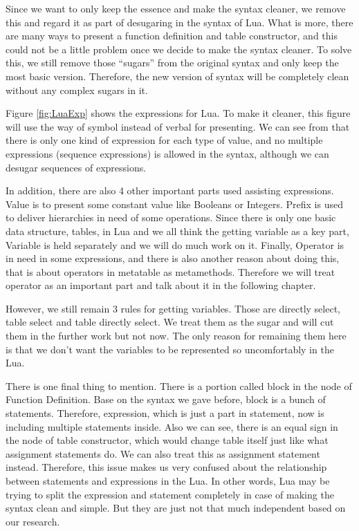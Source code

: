 Since we want to only keep the essence and make the syntax cleaner, we remove this and regard it as part of desugaring in the syntax of Lua. What is more, there are many ways to present a function definition and table constructor, and this could not be a little problem once we decide to make the syntax cleaner. To solve this, we still remove those ``sugars'' from the original syntax and only keep the most basic version. Therefore, the new version of syntax will be completely clean without any complex sugars in it.

Figure \ref{fig:LuaExp} shows the expressions for Lua. To make it cleaner, this figure will use the way of symbol instead of verbal for presenting. We can see from that there is only one kind of expression for each type of value, and no multiple expressions (sequence expressions) is allowed in the syntax, although we can desugar sequences of expressions.

In addition, there are also 4 other important parts used assisting expressions. Value is to present some constant value like Booleans or Integers. Prefix is used to deliver hierarchies in need of some operations. Since there is only one basic data structure, tables, in Lua and we all think the getting variable as a key part, Variable is held separately and we will do much work on it. Finally, Operator is in need in some expressions, and there is also another reason about doing this, that is about operators in metatable as metamethods. Therefore we will treat operator as an important part and talk about it in the following chapter. 

However, we still remain 3 rules for getting variables. Those are directly select, table select and table directly select. We treat them as the sugar and will cut them in the further work but not now. The only reason for remaining them here is that we don't want the variables to be represented so uncomfortably in the Lua.

There is one final thing to mention. There is a portion called block in the node of Function Definition. Base on the syntax we gave before, block is a bunch of statements. Therefore, expression, which is just a part in statement, now is including multiple statements inside. Also we can see, there is an equal sign in the node of table constructor, which would change table itself just like what assignment statements do. We can also treat this as assignment statement instead. Therefore, this issue makes us very confused about the relationship between statements and expressions in the Lua. In other words, Lua may be trying to split the expression and statement completely in case of making the syntax clean and simple. But they are just not that much independent based on our research.

